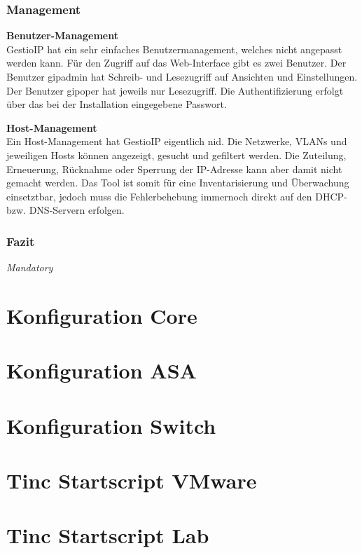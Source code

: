 \documentclass[11pt,a4paper,parskip=half]{scrartcl}
\begin{document}
\subsubsection{Management}
\textbf{Benutzer-Management}\\
GestioIP hat ein sehr einfaches Benutzermanagement, welches nicht angepasst werden kann. Für den Zugriff auf das Web-Interface gibt es zwei Benutzer. Der Benutzer \glqq{}gipadmin\grqq{} hat Schreib- und Lesezugriff auf Ansichten und Einstellungen. Der Benutzer \glqq{}gipoper\grqq{} hat jeweils nur Lesezugriff. Die Authentifizierung erfolgt über das bei der Installation eingegebene Passwort.

\textbf{Host-Management}\\
Ein Host-Management hat GestioIP eigentlich nid. Die Netzwerke, VLANs und jeweiligen Hosts können  angezeigt, gesucht und gefiltert werden. Die Zuteilung, Erneuerung, Rücknahme oder Sperrung der IP-Adresse kann aber damit nicht gemacht werden. Das Tool ist somit für eine Inventarisierung und Überwachung einsetztbar, jedoch muss die Fehlerbehebung immernoch direkt auf den DHCP- bzw. DNS-Servern erfolgen.  

\subsubsection{Fazit}
\textit{Mandatory}

\newpage
\appendix
{}
{}
\section{Konfiguration Core}

\newpage

\section{Konfiguration ASA}

\newpage

\section{Konfiguration Switch}

\newpage

\section{Tinc Startscript VMware}
\label{app:tinc-start-esx}

\newpage

\section{Tinc Startscript Lab}
\label{app:tinc-start-lab}

\newpage
\end{document}
